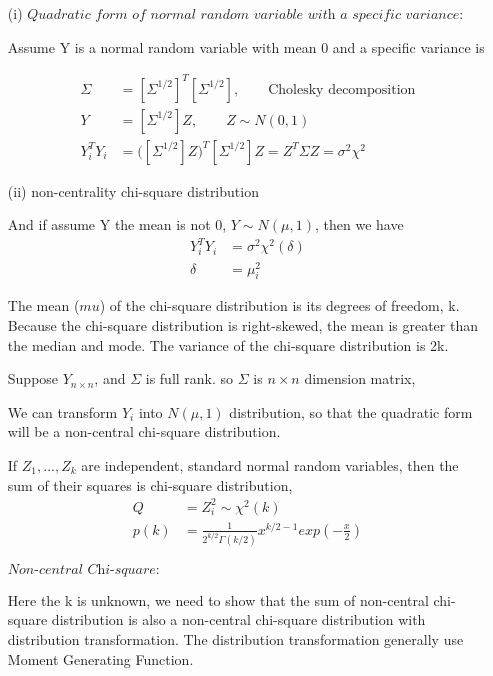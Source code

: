 \documentclass[11pt]{article} %
\begin{document}
	\begin{itemize}
	\item [(i)] $\textit{Quadratic form of normal random variable with a specific variance:}$ 
	
Assume Y is a normal random variable with mean 0 and a specific variance is 

\begin{align*}
	\Sigma &= [\Sigma^{1/2}]^T [\Sigma^{1/2}], \qquad \text{Cholesky decomposition} \\
	Y &= [\Sigma^{1/2}] Z, \qquad Z \sim N(0, 1) \\
	Y_i^T Y_i &= \Big([\Sigma^{1/2}] Z \Big)^T [\Sigma^{1/2}] Z= Z^T \Sigma Z = \sigma^2 \chi^2
\end{align*}	

\item [(ii)]  non-centrality chi-square distribution

And if assume Y the mean is not 0, $Y \sim N(\mu, 1)$, then we have
\begin{align*}
	Y_i^T Y_i &= \sigma^2 \chi^2 (\delta) \\
	\delta &= \mu_i^2
\end{align*}	

The mean ($mu$) of the chi-square distribution is its degrees of freedom, k. Because the chi-square distribution is right-skewed, the mean is greater than the median and mode. The variance of the chi-square distribution is 2k. 

Suppose $Y_{n \times n}$, and $\Sigma$ is full rank. so $\Sigma$ is $n \times n$ dimension matrix, 


		
			We can transform $Y_i$ into $N(\mu, 1)$ distribution, so that the quadratic form will be a non-central chi-square distribution. 
		
		If $Z_1, ..., Z_k$ are independent, standard normal random variables, then the sum of their squares is chi-square distribution,
		\begin{align*}
			Q &= Z_i^2 \sim \chi^2(k)\\
			p(k) &= \frac{1}{2^{k/2} \Gamma(k/2)} x^{k/2-1} exp(-\frac{x}{2})
		\end{align*}
	
	 $\textit{Non-central Chi-square:}$ 
		
	Here the k is unknown, we need to show that the sum of non-central chi-square distribution is also a non-central chi-square distribution with distribution transformation. The distribution transformation generally use Moment Generating Function.		
		

\end{itemize}
\end{document}
